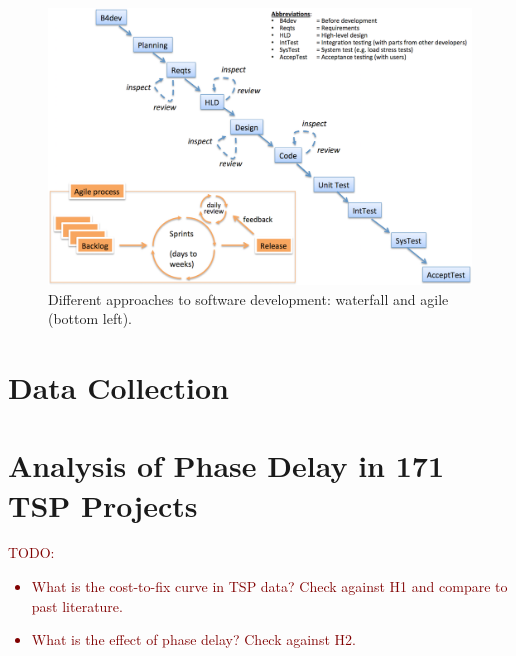 \documentclass{sig-alternate}
\newcommand{\todo}[1]{\textcolor{Maroon}{TODO: #1}}
\newcommand{\bi}{\begin{itemize}[leftmargin=0.4cm]}
\newcommand{\ei}{\end{itemize}}
\begin{document}







%

 
\begin{figure}[!t]
\begin{center}
\includegraphics[width=6in]{waterfall3.png}
\end{center}
\caption{Different approaches to software development:  waterfall and agile (bottom left).}
\label{fig:waterfall}
\end{figure}

\section{Data Collection}












\section{Analysis of Phase Delay in 171 TSP Projects}

\todo{
\bi
    \item What is the cost-to-fix curve in TSP data? Check against H1 and compare to past literature.
    \item What is the effect of phase delay? Check against H2.
\ei
}
\end{document}
